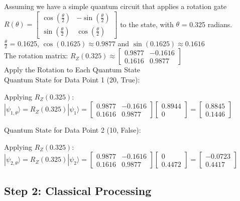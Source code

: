\documentclass[a4paper]{article}
\begin{document}
Assuming we have a simple quantum circuit that applies a rotation gate $
R(\theta) = \begin{bmatrix}
	\cos\left(\frac{\theta}{2}\right) & -\sin\left(\frac{\theta}{2}\right) \\
	\sin\left(\frac{\theta}{2}\right) & \cos\left(\frac{\theta}{2}\right)
\end{bmatrix} $  to the state,  with $\theta$ = 0.325 radians.\\ 

$ \frac{\theta}{2} $ = 0.1625, $ \cos(0.1625) \approx 0.9877 $ and $\sin(0.1625) \approx 0.1616 $\\

The  rotation matrix: $ R_Z(0.325) \approx \begin{bmatrix} 	0.9877 & -0.1616 \\ 	0.1616 & 0.9877 \end{bmatrix} $ \\

Apply the Rotation to Each Quantum State\\

Quantum State for Data Point 1 (20, True):

Applying $R_Z(0.325)$: $
|\psi_{1,\theta}\rangle = R_Z(0.325)|\psi_1\rangle = \begin{bmatrix}
	0.9877 & -0.1616 \\ 0.1616 & 0.9877
\end{bmatrix} \begin{bmatrix} 0.8944 \\ 0 \end{bmatrix} = \begin{bmatrix}
	0.8845 \\ 0.1446 \end{bmatrix}$

Quantum State for Data Point 2 (10, False): 

Applying $R_Z(0.325)$: $|\psi_{2,\theta}\rangle = R_Z(0.325)|\psi_2\rangle = \begin{bmatrix}
	0.9877 & -0.1616 \\	0.1616 & 0.9877 \end{bmatrix} \begin{bmatrix} 0 \\ 0.4472 \end{bmatrix}  = \begin{bmatrix}
	-0.0723 \\	0.4417 \end{bmatrix} $

\subsection{Step 2: Classical Processing}
\end{document}
